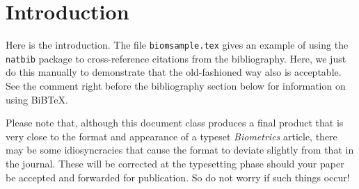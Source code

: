 \documentclass[useAMS,referee]{biom}
\begin{document}

\maketitle


%

\section{Introduction}
\label{s:intro}

Here is the introduction. The file \texttt{biomsample.tex} gives an
example of using the \texttt{natbib} package to cross-reference
citations from the bibliography.  Here, we just do this manually to
demonstrate that the old-fashioned way also is acceptable.  See the
comment right before the bibliography section below for information on
using BiBTeX.

Please note that, although this document class produces a final
product that is very close to the format and appearance of a typeset
\textit{Biometrics} article, there may be some idiosyncracies that
cause the format to deviate slightly from that in the journal.  These
will be corrected at the typesetting phase should your paper be accepted
and forwarded for publication.  So do not worry if such things occur!
\end{document}
